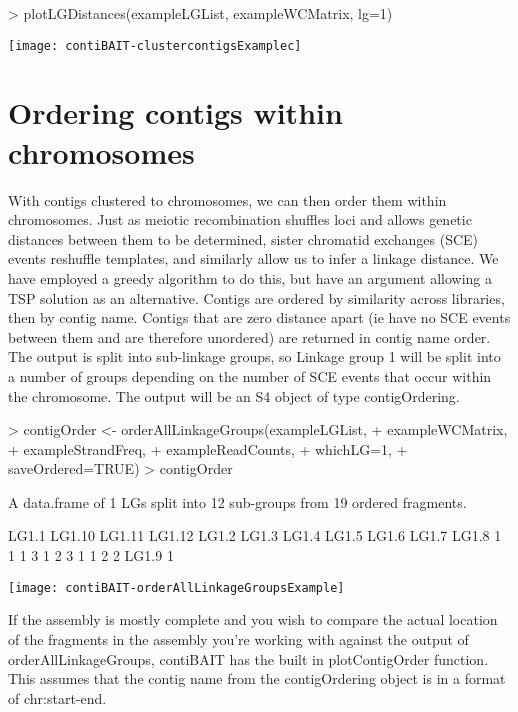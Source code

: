 \documentclass{article}
\begin{document}
\begin{Schunk}
\begin{Sinput}
> plotLGDistances(exampleLGList, exampleWCMatrix, lg=1)
\end{Sinput}
\end{Schunk}
\texttt{[image: contiBAIT-clustercontigsExamplec]}


\section{Ordering contigs within chromosomes}

With contigs clustered to chromosomes, we can then order them within chromosomes. Just as meiotic recombination shuffles loci and allows genetic distances between them to be determined, sister chromatid exchanges (SCE) events reshuffle templates, and similarly allow us to infer a linkage distance. We have employed a greedy algorithm to do this, but have an argument allowing a TSP solution as an alternative. Contigs are ordered by similarity across libraries, then by contig name. Contigs that are zero distance apart (ie have no SCE events between them and are therefore unordered) are returned in contig name order. The output is split into sub-linkage groups, so Linkage group 1 will be split into a number of groups depending on the number of SCE events that occur within the chromosome. The output will be an S4 object of type contigOrdering.

\begin{Schunk}
\begin{Sinput}
> contigOrder <- orderAllLinkageGroups(exampleLGList,
+ exampleWCMatrix,
+ exampleStrandFreq,
+ exampleReadCounts,
+ whichLG=1,
+ saveOrdered=TRUE)
> contigOrder
\end{Sinput}
\begin{Soutput}
A data.frame of 1 LGs split into 12 sub-groups from 19 ordered fragments.

 LG1.1 LG1.10 LG1.11 LG1.12  LG1.2  LG1.3  LG1.4  LG1.5  LG1.6  LG1.7  LG1.8 
     1      1      1      3      1      2      3      1      1      2      2 
 LG1.9 
     1 
\end{Soutput}
\end{Schunk}
\texttt{[image: contiBAIT-orderAllLinkageGroupsExample]}

If the assembly is mostly complete and you wish to compare the actual location of the fragments in the assembly you're working with against the output of orderAllLinkageGroups, contiBAIT has the built in plotContigOrder function. This assumes that the contig name from the contigOrdering object is in a format of chr:start-end.
\end{document}
